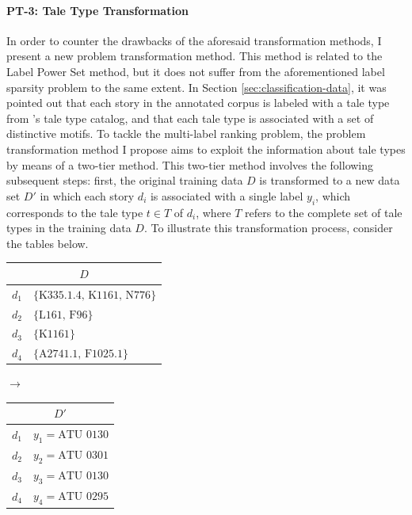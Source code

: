 \paragraph{PT-3: Tale Type Transformation}

In order to counter the drawbacks of the aforesaid transformation methods, I present a new problem transformation method. This method is related to the Label Power Set method, but it does not suffer from the aforementioned label sparsity problem to the same extent. In Section \ref{sec:classification-data}, it was pointed out that each story in the annotated corpus is labeled with a tale type from \citeauthor{uther:2004}'s tale type catalog, and that each tale type is associated with a set of distinctive motifs. To tackle the multi-label ranking problem, the problem transformation method I propose aims to exploit the information about tale types by means of a two-tier method. This two-tier method involves the following subsequent steps: first, the original training data $D$ is transformed to a new data set $D'$ in which each story $d_i$ is associated with a single label $y_i$, which corresponds to the tale type $t \in T$ of $d_i$, where $T$ refers to the complete set of tale types in the training data $D$. To illustrate this transformation process, consider the tables below.

\begin{table}[h]
\centering
\begin{tabular}{ll}
\multicolumn{2}{c}{$D$}\\
\toprule
$d_1$ & $\{\text{K335.1.4, K1161, N776}\}$ \\
$d_2$ & $\{\text{L161, F96}\}$ \\
$d_3$ & $\{\text{K1161}\}$ \\
$d_4$ & $\{\text{A2741.1, F1025.1}\}$ \\
\bottomrule
\end{tabular}
\quad$\rightarrow$\quad
\begin{tabular}{ll}
\multicolumn{2}{c}{$D'$}\\
\toprule
$d_1$ & $y_1 = \text{ATU\ 0130}$ \\
$d_2$ & $y_2 = \text{ATU\ 0301}$ \\
$d_3$ & $y_3 = \text{ATU\ 0130}$ \\
$d_4$ & $y_4 = \text{ATU\ 0295}$ \\
\bottomrule
\end{tabular}
\end{table}

